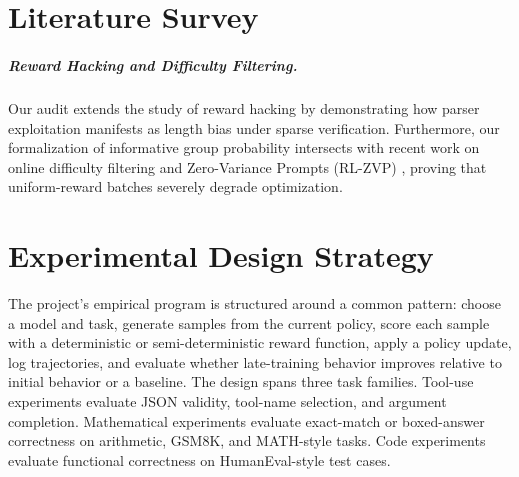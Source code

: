 \documentclass[12pt,a4paper]{report}
\begin{document}
\chapter{Literature Survey}

\paragraph{Reward Hacking and Difficulty Filtering.}
Our audit extends the study of reward hacking \citep{gao2023scaling} by demonstrating how parser exploitation manifests as length bias under sparse verification. Furthermore, our formalization of informative group probability intersects with recent work on online difficulty filtering and Zero-Variance Prompts (RL-ZVP) \citep{rlzvp2025}, proving that uniform-reward batches severely degrade optimization.

\label{ch:literature-survey}












\chapter{Experimental Design Strategy}
\label{ch:experimental-design}

The project's empirical program is structured around a common pattern: choose a model and task, generate samples from the current policy, score each sample with a deterministic or semi-deterministic reward function, apply a policy update, log trajectories, and evaluate whether late-training behavior improves relative to initial behavior or a baseline. The design spans three task families. Tool-use experiments evaluate JSON validity, tool-name selection, and argument completion. Mathematical experiments evaluate exact-match or boxed-answer correctness on arithmetic, GSM8K, and MATH-style tasks. Code experiments evaluate functional correctness on HumanEval-style test cases.
\end{document}
